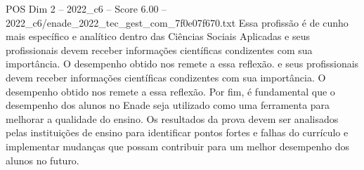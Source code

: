 \begin{textsample}{POS Dim 2 – 2022\_c6 – Score 6.00 – 2022\_c6/enade\_2022\_tec\_gest\_com\_7f0e07f670.txt}
Essa profissão é de cunho mais específico e analítico dentro das Ciências Sociais Aplicadas e seus profissionais devem receber informações científicas condizentes com sua importância.
O desempenho obtido nos remete a essa reflexão. e seus profissionais devem receber informações científicas condizentes com sua importância.
O desempenho obtido nos remete a essa reflexão.
Por fim, é fundamental que o desempenho dos alunos no Enade seja utilizado como uma ferramenta para melhorar a qualidade do ensino.
Os resultados da prova devem ser analisados pelas instituições de ensino para identificar pontos fortes e falhas do currículo e implementar mudanças que possam contribuir para um melhor desempenho dos alunos no futuro.

\end{textsample}
